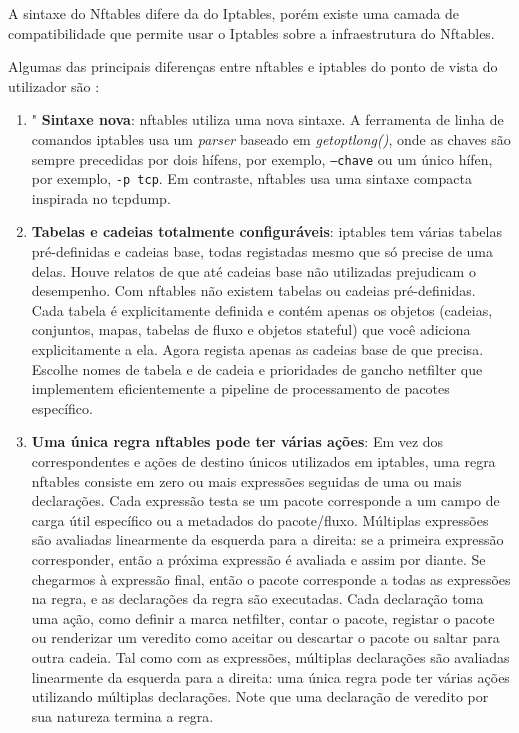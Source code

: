 A sintaxe do Nftables difere da do Iptables, porém existe uma camada de 
compatibilidade que permite usar o Iptables sobre a infraestrutura do Nftables.


Algumas das principais diferenças entre nftables e iptables do ponto de vista do 
utilizador são \cite{diffiptenft}:

\begin{enumerate}

\item " \textbf{Sintaxe nova}: nftables utiliza uma nova sintaxe. A ferramenta de 
linha de comandos iptables usa um \textit{parser} baseado em \textit{getoptlong()}, onde as 
chaves são sempre precedidas por dois hífens, por exemplo, \texttt{--chave} ou 
um único hífen, por exemplo, \texttt{-p tcp}. Em contraste, nftables usa uma 
sintaxe compacta inspirada no tcpdump.

\item \textbf{Tabelas e cadeias totalmente configuráveis}: iptables tem várias 
tabelas pré-definidas e cadeias base, todas registadas mesmo que só precise de uma 
delas. Houve relatos de que até cadeias base não utilizadas prejudicam o desempenho. 
Com nftables não existem tabelas ou cadeias pré-definidas. Cada tabela é explicitamente 
definida e contém apenas os objetos (cadeias, conjuntos, mapas, tabelas de fluxo e 
objetos stateful) que você adiciona explicitamente a ela. Agora regista apenas as 
cadeias base de que precisa. Escolhe nomes de tabela e de cadeia e prioridades de 
gancho netfilter que implementem eficientemente a pipeline de processamento de 
pacotes específico.

\item \textbf{Uma única regra nftables pode ter várias ações}: Em vez dos correspondentes 
e ações de destino únicos utilizados em iptables, uma regra nftables consiste em zero 
ou mais expressões seguidas de uma ou mais declarações. Cada expressão testa se um pacote 
corresponde a um campo de carga útil específico ou a metadados do pacote/fluxo. Múltiplas 
expressões são avaliadas linearmente da esquerda para a direita: se a primeira expressão 
corresponder, então a próxima expressão é avaliada e assim por diante. Se chegarmos à 
expressão final, então o pacote corresponde a todas as expressões na regra, e as 
declarações da regra são executadas. Cada declaração toma uma ação, como definir 
a marca netfilter, contar o pacote, registar o pacote ou renderizar um veredito 
como aceitar ou descartar o pacote ou saltar para outra cadeia. Tal como com as 
expressões, múltiplas declarações são avaliadas linearmente da esquerda para a 
direita: uma única regra pode ter várias ações utilizando múltiplas declarações. 
Note que uma declaração de veredito por sua natureza termina a regra.


\end{enumerate}
